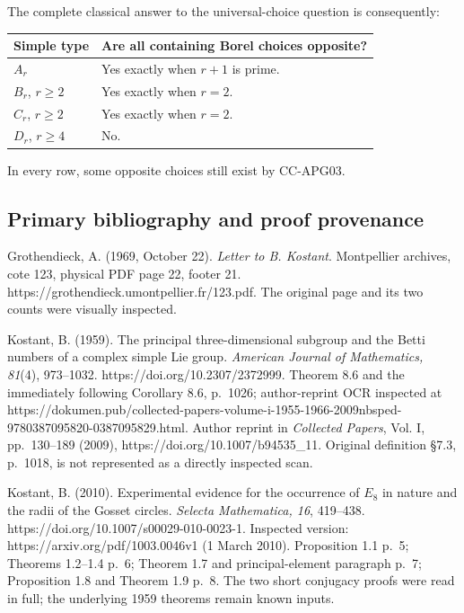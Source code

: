 The complete classical answer to the universal-choice question is
consequently:

\begin{longtable}[]{@{}ll@{}}
\toprule\noalign{}
Simple type & Are all containing Borel choices opposite? \\
\midrule\noalign{}
\endhead
\bottomrule\noalign{}
\endlastfoot
\(A_r\) & Yes exactly when \(r+1\) is prime. \\
\(B_r\), \(r\geq2\) & Yes exactly when \(r=2\). \\
\(C_r\), \(r\geq2\) & Yes exactly when \(r=2\). \\
\(D_r\), \(r\geq4\) & No. \\
\end{longtable}

In every row, some opposite choices still exist by CC-APG03.

\subsection{Primary bibliography and proof
provenance}\label{primary-bibliography-and-proof-provenance}

Grothendieck, A. (1969, October 22). \emph{Letter to B. Kostant}.
Montpellier archives, cote 123, physical PDF page 22, footer 21.
https://grothendieck.umontpellier.fr/123.pdf. The original page and its
two counts were visually inspected.

Kostant, B. (1959). The principal three-dimensional subgroup and the
Betti numbers of a complex simple Lie group. \emph{American Journal of
Mathematics, 81}(4), 973--1032. https://doi.org/10.2307/2372999. Theorem
8.6 and the immediately following Corollary 8.6, p.~1026; author-reprint
OCR inspected at
https://dokumen.pub/collected-papers-volume-i-1955-1966-2009nbsped-9780387095820-0387095829.html.
Author reprint in \emph{Collected Papers}, Vol. I, pp.~130--189 (2009),
https://doi.org/10.1007/b94535\_11. Original definition §7.3, p.~1018,
is not represented as a directly inspected scan.

Kostant, B. (2010). Experimental evidence for the occurrence of \(E_8\)
in nature and the radii of the Gosset circles. \emph{Selecta
Mathematica, 16}, 419--438. https://doi.org/10.1007/s00029-010-0023-1.
Inspected version: https://arxiv.org/pdf/1003.0046v1 (1 March 2010).
Proposition 1.1 p.~5; Theorems 1.2--1.4 p.~6; Theorem 1.7 and
principal-element paragraph p.~7; Proposition 1.8 and Theorem 1.9 p.~8.
The two short conjugacy proofs were read in full; the underlying 1959
theorems remain known inputs.

